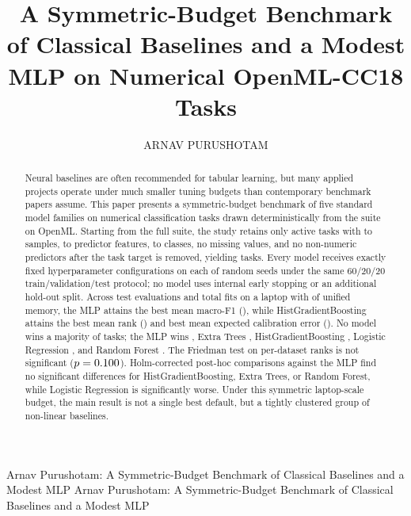 \documentclass{ieeeaccess}
\begin{document}
\vol{}
\year{}
\history{}
\doi{}

\title{A Symmetric-Budget Benchmark of Classical Baselines and a Modest MLP on Numerical OpenML-CC18 Tasks}

\author{\uppercase{Arnav Purushotam}}

\address[1]{University of Colorado Boulder, Boulder, CO 80309 USA (e-mail: arnavpsusa@gmail.com)}

\markboth
{Arnav Purushotam: A Symmetric-Budget Benchmark of Classical Baselines and a Modest MLP}
{Arnav Purushotam: A Symmetric-Budget Benchmark of Classical Baselines and a Modest MLP}


\begin{abstract}
Neural baselines are often recommended for tabular learning, but many applied projects operate under much smaller tuning budgets than contemporary benchmark papers assume. This paper presents a symmetric-budget benchmark of five standard model families on numerical classification tasks drawn deterministically from the \BenchmarkSuiteName{} suite on OpenML. Starting from the full suite, the study retains only active tasks with \MinInstances{} to \MaxInstances{} samples, \MinFeatures{} to \MaxFeatures{} predictor features, \MinClasses{} to \MaxClasses{} classes, no missing values, and no non-numeric predictors after the task target is removed, yielding \DatasetCount{} tasks. Every model receives exactly \SearchConfigsPerModel{} fixed hyperparameter configurations on each of \SeedCount{} random seeds under the same 60/20/20 train/validation/test protocol; no model uses internal early stopping or an additional hold-out split. Across \TotalRuns{} test evaluations and \TotalModelFits{} total fits on a \HardwareCPU{} laptop with \HardwareRAM{} of unified memory, the MLP attains the best mean macro-F1 (\BestMacroFOneValue{}), while HistGradientBoosting attains the best mean rank (\BestMeanRank{}) and best mean expected calibration error (\BestECEValue{}). No model wins a majority of tasks; the MLP wins \MLPTaskWins{}, Extra Trees \ExtraTreesTaskWins{}, HistGradientBoosting \HGBTaskWins{}, Logistic Regression \LogisticTaskWins{}, and Random Forest \RandomForestTaskWins{}. The Friedman test on per-dataset ranks is not significant ($p=0.100$). Holm-corrected post-hoc comparisons against the MLP find no significant differences for HistGradientBoosting, Extra Trees, or Random Forest, while Logistic Regression is significantly worse. Under this symmetric laptop-scale budget, the main result is not a single best default, but a tightly clustered group of non-linear baselines.
\end{abstract}
\end{document}
